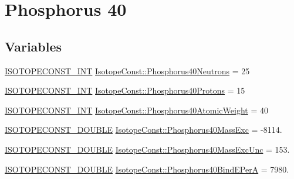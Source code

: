 \hypertarget{group___isotope_const-_phosphorus-_p40}{}\section{Phosphorus 40}
\label{group___isotope_const-_phosphorus-_p40}
\subsection*{Variables}
\begin{DoxyCompactItemize}
\item 
\mbox{\hyperlink{group___isotope_const-_macros_ga5f18360b3e99483a35c32d789e62621c}{I\+S\+O\+T\+O\+P\+E\+C\+O\+N\+S\+T\+\_\+\+I\+NT}} \mbox{\hyperlink{group___isotope_const-_phosphorus-_p40_ga2fc24d0d91eb379df4e6e2c95815c245}{Isotope\+Const\+::\+Phosphorus40\+Neutrons}} = 25
\item 
\mbox{\hyperlink{group___isotope_const-_macros_ga5f18360b3e99483a35c32d789e62621c}{I\+S\+O\+T\+O\+P\+E\+C\+O\+N\+S\+T\+\_\+\+I\+NT}} \mbox{\hyperlink{group___isotope_const-_phosphorus-_p40_ga1596e1441a9b470fc8d977a0373e6419}{Isotope\+Const\+::\+Phosphorus40\+Protons}} = 15
\item 
\mbox{\hyperlink{group___isotope_const-_macros_ga5f18360b3e99483a35c32d789e62621c}{I\+S\+O\+T\+O\+P\+E\+C\+O\+N\+S\+T\+\_\+\+I\+NT}} \mbox{\hyperlink{group___isotope_const-_phosphorus-_p40_gac5cd39290bff9743e2109fac45313dd2}{Isotope\+Const\+::\+Phosphorus40\+Atomic\+Weight}} = 40
\item 
\mbox{\hyperlink{group___isotope_const-_macros_ga8f45a7272ce02c0b4c65c44636ed719a}{I\+S\+O\+T\+O\+P\+E\+C\+O\+N\+S\+T\+\_\+\+D\+O\+U\+B\+LE}} \mbox{\hyperlink{group___isotope_const-_phosphorus-_p40_ga9feaf737d3e586edb2eb8c8419e57362}{Isotope\+Const\+::\+Phosphorus40\+Mass\+Exc}} = -\/8114.
\item 
\mbox{\hyperlink{group___isotope_const-_macros_ga8f45a7272ce02c0b4c65c44636ed719a}{I\+S\+O\+T\+O\+P\+E\+C\+O\+N\+S\+T\+\_\+\+D\+O\+U\+B\+LE}} \mbox{\hyperlink{group___isotope_const-_phosphorus-_p40_ga44d2eb524718dd21c60ead1dedf4de2e}{Isotope\+Const\+::\+Phosphorus40\+Mass\+Exc\+Unc}} = 153.
\item 
\mbox{\hyperlink{group___isotope_const-_macros_ga8f45a7272ce02c0b4c65c44636ed719a}{I\+S\+O\+T\+O\+P\+E\+C\+O\+N\+S\+T\+\_\+\+D\+O\+U\+B\+LE}} \mbox{\hyperlink{group___isotope_const-_phosphorus-_p40_ga6407772c6f5e571ee35b2f08c4425296}{Isotope\+Const\+::\+Phosphorus40\+Bind\+E\+PerA}} = 7980.
\item 

\end{DoxyCompactItemize}
